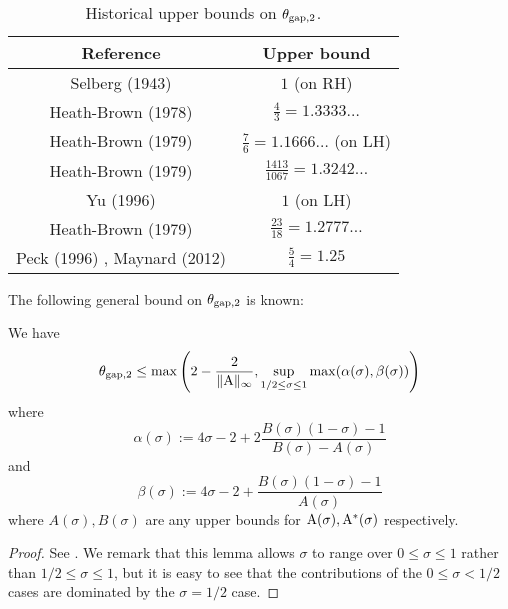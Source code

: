     \begin{table}[ht]
        \caption{Historical upper bounds on $\theta_{\mathrm{gap},2}$.}
        \centering
        \renewcommand{\arraystretch}{1.2}
        \begin{tabular}{|c|c|}
        \hline
        Reference & Upper bound \\
        \hline
        Selberg (1943) \cite{selberg_1943} & $1$ (on RH)\\
        \hline
        Heath-Brown (1978) \cite{heath_brown_consecutive_I} & $\frac{4}{3} = 1.3333\dots$\\
        \hline
        Heath-Brown (1979) \cite{heath_brown_consecutive_II} & $\frac{7}{6} = 1.1666\dots$ (on LH) \\
        \hline
        Heath-Brown (1979) \cite{heath_brown_consecutive_II} & $\frac{1413}{1067} = 1.3242\dots$ \\
        \hline
        Yu (1996) \cite{yu_differences_1996} & $1$ (on LH) \\
        \hline
        Heath-Brown (1979) \cite{heath_brown_consecutive_III} & $\frac{23}{18} = 1.2777\dots$ \\
        \hline
        Peck (1996) \cite{peck_on_1996}, Maynard (2012) \cite{maynard_difference_2012} & $\frac{5}{4} = 1.25$ \\
        \hline
        \end{tabular}
        \end{table}\label{gapsquare-table}

The following general bound on $\theta_{\mathrm{gap},2}$ is known:

\begin{proposition}\label{gapsquare-from-a}
    We have
    $$ \theta_{\mathrm{gap},2} \leq \max\left( 2-\frac{2}{\|\mathrm{A}\|_\infty}, \sup_{1/2 \leq \sigma \leq 1} \max(\alpha(\sigma), \beta(\sigma))\right)$$
    where
    $$ \alpha(\sigma) := 4\sigma - 2 + 2 \frac{B(\sigma)(1-\sigma)-1}{B(\sigma)-A(\sigma)}$$
    and
    $$ \beta(\sigma) := 4\sigma - 2 + \frac{B(\sigma)(1-\sigma)-1}{A(\sigma)}$$
    where $A(\sigma), B(\sigma)$ are any upper bounds for $\mathrm{A}(\sigma), \mathrm{A}^*(\sigma)$ respectively.
\end{proposition}

\begin{proof} See \cite[Lemma 2]{heath_brown_consecutive_II}. We remark that this lemma allows $\sigma$ to range over $0 \leq \sigma \leq 1$ rather than $1/2 \leq \sigma \leq 1$, but it is easy to see that the contributions of the $0 \leq \sigma < 1/2$ cases are dominated by the $\sigma=1/2$ case.
\end{proof}

